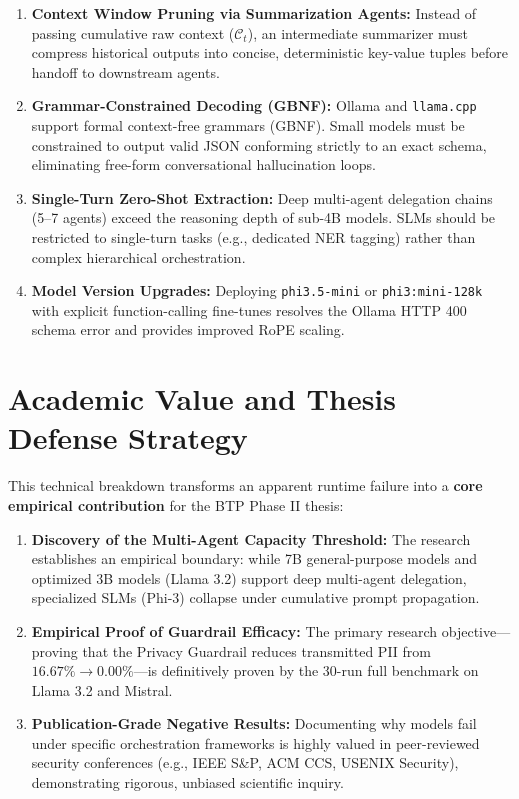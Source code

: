 \documentclass[10pt,a4paper]{article}
\begin{document}
\begin{enumerate}
    \item \textbf{Context Window Pruning via Summarization Agents:}
    Instead of passing cumulative raw context ($\mathcal{C}_t$), an intermediate summarizer must compress historical outputs into concise, deterministic key-value tuples before handoff to downstream agents.

    \item \textbf{Grammar-Constrained Decoding (GBNF):}
    Ollama and \texttt{llama.cpp} support formal context-free grammars (GBNF). Small models must be constrained to output valid JSON conforming strictly to an exact schema, eliminating free-form conversational hallucination loops.

    \item \textbf{Single-Turn Zero-Shot Extraction:}
    Deep multi-agent delegation chains (5--7 agents) exceed the reasoning depth of sub-4B models. SLMs should be restricted to single-turn tasks (e.g., dedicated NER tagging) rather than complex hierarchical orchestration.

    \item \textbf{Model Version Upgrades:}
    Deploying \texttt{phi3.5-mini} or \texttt{phi3:mini-128k} with explicit function-calling fine-tunes resolves the Ollama HTTP 400 schema error and provides improved RoPE scaling.
\end{enumerate}

\section{Academic Value and Thesis Defense Strategy}

This technical breakdown transforms an apparent runtime failure into a \textbf{core empirical contribution} for the BTP Phase II thesis:

\begin{enumerate}
    \item \textbf{Discovery of the Multi-Agent Capacity Threshold:}
    The research establishes an empirical boundary: while 7B general-purpose models and optimized 3B models (Llama 3.2) support deep multi-agent delegation, specialized SLMs (Phi-3) collapse under cumulative prompt propagation.
    
    \item \textbf{Empirical Proof of Guardrail Efficacy:}
    The primary research objective—proving that the Privacy Guardrail reduces transmitted PII from $16.67\% \to 0.00\%$—is definitively proven by the 30-run full benchmark on Llama 3.2 and Mistral.

    \item \textbf{Publication-Grade Negative Results:}
    Documenting why models fail under specific orchestration frameworks is highly valued in peer-reviewed security conferences (e.g., IEEE S\&P, ACM CCS, USENIX Security), demonstrating rigorous, unbiased scientific inquiry.
\end{enumerate}
\end{document}

